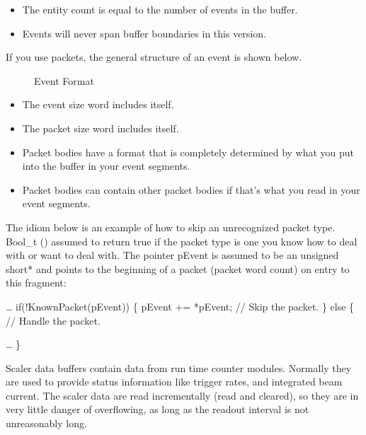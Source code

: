    \begin{itemize}
      \item The entity count is equal to the number of events in
         the buffer.
      \item Events will never span buffer boundaries in this version.
   \end{itemize}
   
   If you use packets, the general structure of an event is 
   shown below.
     \begin{figure}[htb]
	 \caption{Event Format}\label{f:eventformat}
      \end{figure}
 
   \begin{note}
      \begin{itemize}
         \item The event size word includes itself.
         \item The packet size word includes itself.
         \item Packet bodies have a format that is 
            completely determined by what you put into the
            buffer in your event segments.
         \item Packet bodies can contain other packet bodies
            if that's what you read in your event segments.
      \end{itemize}
   \end{note}
   
   The idiom below is an example of how to skip an 
   unrecognized packet type. Bool\_t () 
   assumed to return true if the packet type is one you
   know how to deal with or want to deal with. The pointer pEvent
   is assumed to be an unsigned short* and points to the
   beginning of a packet (packet word count) on entry to
   this fragment:
   \begin{example}
      \ldots
      if(!KnownPacket(pEvent)) \{
         pEvent += *pEvent;    // Skip the packet.
      \}
      else \{
         // Handle the packet.
         
         \ldots
      \}

   \end{example}
   
   Scaler data buffers contain data from run time counter
   modules.  Normally they are used to provide status 
   information like trigger rates, and integrated beam
   current.  The scaler data are read incrementally (read
   and cleared), so they are in very little danger of 
   overflowing, as long as the readout interval is not
   unreasonably long.
   
